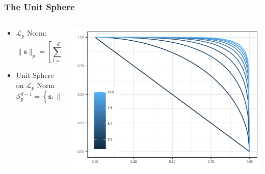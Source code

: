 \documentclass[aspectratio=169]{beamer}
\begin{document}
\begin{frame}
  \frametitle{The Unit Sphere}
  \begin{columns}
    \begin{column}{.48\textwidth}
      \begin{itemize}
        \item $\mathcal{L}_p$ Norm:
          \begin{equation*}
            \lVert \bm{s}\rVert_p = \left[\sum_{l = 1}^ds_l^p\right]^{\frac{1}{p}}
          \end{equation*}
        \pause
        \item Unit Sphere on $\mathcal{L}_p$ Norm
          \begin{equation*}
            \mathcal{S}_{p}^{d-1} = \left\lbrace \bm{s} : \lVert\bm{s}\rVert_p = 1 \right\rbrace
          \end{equation*}
      \end{itemize}
    \end{column}%
    \hfill%
    \pause
    \begin{column}{.48\textwidth}
      \begin{center}
        \includegraphics{./images/p_sphere}
      \end{center}
    \end{column}%
  \end{columns}%
\end{frame}
\end{document}
